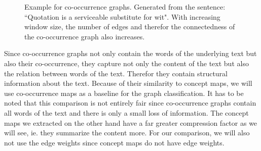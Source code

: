 \begin{figure}[ht]%
    \centering
    \caption{Example for co-occurrence graphs. Generated from the sentence: ``Quotation is a serviceable substitute for wit". With increasing window size, the number of edges and therefor the connectedness of the co-occurrence graph also increases.}%
    \label{fig:cooccurrence_graphs}%
\end{figure}

Since co-occurrence graphs not only contain the words of the underlying text but also their co-occurrence, they capture not only the content of the text but also the relation between words of the text.
Therefor they contain structural information about the text.
Because of their similarity to concept maps, we will use co-occurrence maps as a baseline for the graph classification.
It has to be noted that this comparison is not entirely fair since co-occurrence graphs contain all words of the text and there is only a small loss of information.
The concept maps we extracted on the other hand have a far greater compression factor as we will see, ie. they summarize the content more.
For our comparison, we will also not use the edge weights since concept maps do not have edge weights.

